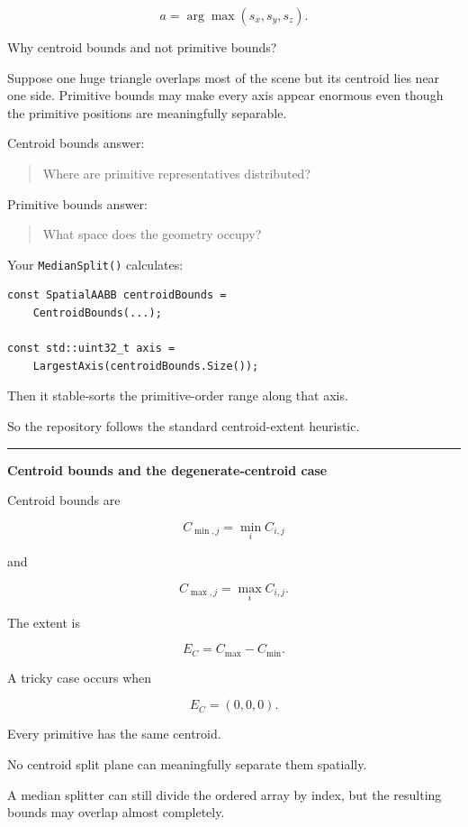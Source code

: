 \[
a=\arg\max(s_x,s_y,s_z).
\]

Why centroid bounds and not primitive bounds?

Suppose one huge triangle overlaps most of the scene but its centroid lies near one side. Primitive bounds may make every axis appear enormous even though the primitive positions are meaningfully separable.

Centroid bounds answer:

\begin{quote}
Where are primitive representatives distributed?
\end{quote}

Primitive bounds answer:

\begin{quote}
What space does the geometry occupy?
\end{quote}

Your \texttt{MedianSplit()} calculates:

\begin{verbatim}
const SpatialAABB centroidBounds =
    CentroidBounds(...);

const std::uint32_t axis =
    LargestAxis(centroidBounds.Size());
\end{verbatim}

Then it stable-sorts the primitive-order range along that axis.

So the repository follows the standard centroid-extent heuristic.

\begin{center}\rule{0.5\linewidth}{0.5pt}\end{center}

\textbf{Centroid bounds and the degenerate-centroid case}

Centroid bounds are

\[
C_{\min,j}
=
\min_i C_{i,j}
\]

and

\[
C_{\max,j}
=
\max_i C_{i,j}.
\]

The extent is

\[
E_C=C_{\max}-C_{\min}.
\]

A tricky case occurs when

\[
E_C=(0,0,0).
\]

Every primitive has the same centroid.

No centroid split plane can meaningfully separate them spatially.

A median splitter can still divide the ordered array by index, but the resulting bounds may overlap almost completely.

